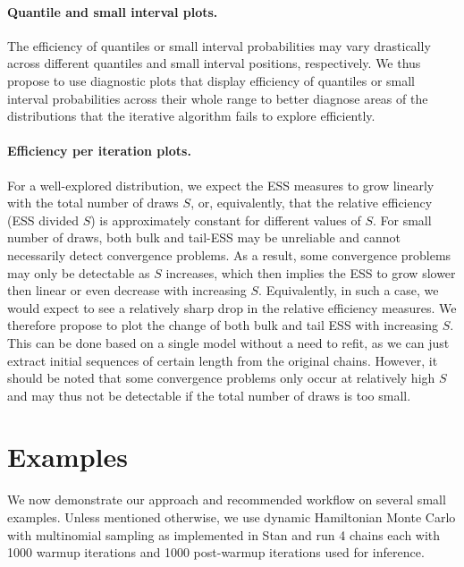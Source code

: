 \documentclass[american,]{article}
\let\oldparagraph\paragraph
\renewcommand{\paragraph}[1]{\oldparagraph{#1}\mbox{}}
\theoremstyle{definition}
\begin{document}
\hypertarget{quantile-and-small-interval-plots}{%
\paragraph{Quantile and small interval
plots.}\label{quantile-and-small-interval-plots}}
The efficiency of quantiles or small interval probabilities may vary
drastically across different quantiles and small interval positions,
respectively. We thus propose to use diagnostic plots that display
efficiency of quantiles or small interval probabilities across their
whole range to better diagnose areas of the distributions that the
iterative algorithm fails to explore efficiently.

\hypertarget{efficiency-change-plots}{%
\paragraph{Efficiency per iteration plots.}\label{efficiency-change-plots}}
For a well-explored distribution, we expect the ESS measures to grow
linearly with the total number of draws \(S\), or, equivalently, that
the relative efficiency (ESS divided \(S\)) is approximately constant
for different values of \(S\). For small number of draws, both bulk and
tail-ESS may be unreliable and cannot necessarily detect convergence
problems. As a result, some convergence problems may only be
detectable as \(S\) increases, which then implies the ESS to grow slower
then linear or even decrease with increasing \(S\). Equivalently, in
such a case, we would expect to see a relatively sharp drop in the
relative efficiency measures. We therefore propose to plot the change of
both bulk and tail ESS with increasing \(S\). This can be done based on
a single model without a need to refit, as we can just extract initial
sequences of certain length from the original chains. However, it should
be noted that some convergence problems only occur at relatively high
\(S\) and may thus not be detectable if the total number of draws is too
small.

\hypertarget{examples}{%
\section{Examples}\label{examples}}

We now demonstrate our approach and recommended workflow on several small examples.
Unless mentioned otherwise, we use dynamic Hamiltonian Monte Carlo with
multinomial sampling \citep{betancourt2017conceptual} as implemented
in Stan \citep{StanManual.2.18.0} and run 4 chains each with 1000
warmup iterations and 1000 post-warmup iterations used for inference.
\end{document}
